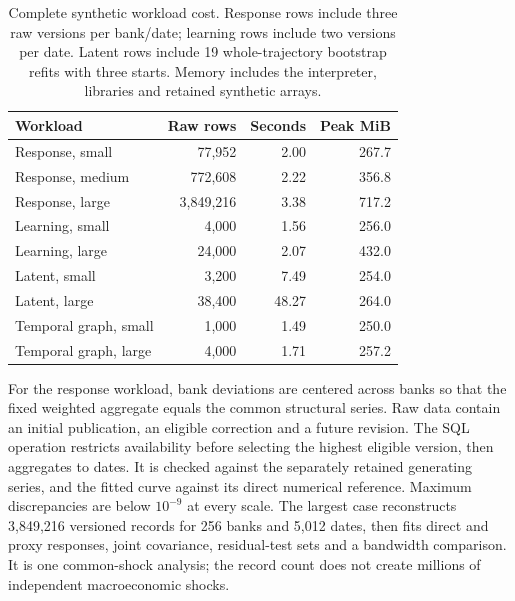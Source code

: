 \begin{table}[htbp]\centering\small


\begin{tabular}{lrrr}
\toprule
Workload & Raw rows & Seconds & Peak MiB\\
\midrule
Response, small & 77,952 & 2.00 & 267.7\\
Response, medium & 772,608 & 2.22 & 356.8\\
Response, large & 3,849,216 & 3.38 & 717.2\\
Learning, small & 4,000 & 1.56 & 256.0\\
Learning, large & 24,000 & 2.07 & 432.0\\
Latent, small & 3,200 & 7.49 & 254.0\\
Latent, large & 38,400 & 48.27 & 264.0\\
Temporal graph, small & 1,000 & 1.49 & 250.0\\
Temporal graph, large & 4,000 & 1.71 & 257.2\\
\bottomrule
\end{tabular}



\caption{Complete synthetic workload cost. Response rows include three raw
versions per bank/date; learning rows include two versions per date.
Latent rows include 19 whole-trajectory bootstrap refits with three starts.
Memory includes the interpreter, libraries and retained synthetic arrays.}
\label{s4:workflow-cost}
\end{table}

For the response workload, bank deviations are centered across banks so
that the fixed weighted aggregate equals the common structural series.
Raw data contain an initial publication, an eligible correction and a
future revision. The SQL operation restricts availability before selecting
the highest eligible version, then aggregates to dates. It is checked
against the separately retained generating series, and the fitted curve
against its direct numerical reference. Maximum discrepancies are below
$10^{-9}$ at every scale. The largest case reconstructs 3,849,216 versioned
records for 256 banks and 5,012 dates, then fits direct and proxy responses,
joint covariance, residual-test sets and a bandwidth comparison. It is
one common-shock analysis; the record count does not create millions of
independent macroeconomic shocks.

